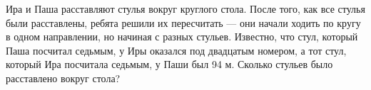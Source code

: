 
Ира и Паша расставляют стулья вокруг круглого стола. 
После того, как все стулья были расставлены, ребята решили их пересчитать — они начали ходить 
по кругу в одном направлении, но начиная с разных стульев. Известно, что стул, который Паша посчитал седьмым, 
у Иры оказался под двадцатым номером, а тот стул, который Ира посчитала седьмым, у Паши был 94 м. 
Сколько стульев было расставлено вокруг стола?

\soultionSection


